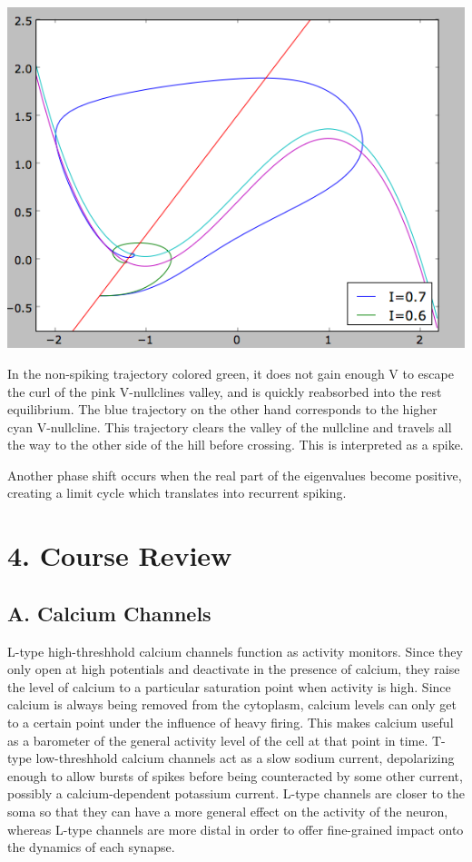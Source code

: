 \documentclass[12pt]{article}
\begin{document}
\vspace{15pt}
\includegraphics[scale=0.71]{phaseplanethreshhold.png}
\vspace{5pt}

In the non-spiking trajectory colored green, it does not gain enough V to escape the curl of the pink V-nullclines valley, and is quickly reabsorbed into the rest equilibrium.  The blue trajectory on the other hand corresponds to the higher cyan V-nullcline.  This trajectory clears the valley of the nullcline and travels all the way to the other side of the hill before crossing.  This is interpreted as a spike.  

Another phase shift occurs when the real part of the eigenvalues become positive, creating a limit cycle which translates into recurrent spiking.  

\section{4. Course Review}

\subsection{A. Calcium Channels}

L-type high-threshhold calcium channels function as activity monitors.  Since they only open at high potentials and deactivate in the presence of calcium, they raise the level of calcium to a particular saturation point when activity is high.  Since calcium is always being removed from the cytoplasm, calcium levels can only get to a certain point under the influence of heavy firing.  This makes calcium useful as a barometer of the general activity level of the cell at that point in time.  T-type low-threshhold calcium channels act as a slow sodium current, depolarizing enough to allow bursts of spikes before being counteracted by some other current, possibly a calcium-dependent potassium current.  L-type channels are closer to the soma so that they can have a more general effect on the activity of the neuron, whereas L-type channels are more distal in order to offer fine-grained impact onto the dynamics of each synapse.  
\end{document}
